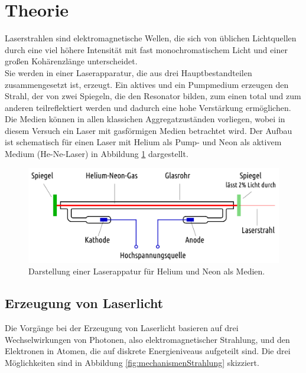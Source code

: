 \section{Theorie}
\label{sec:Theorie}

Laserstrahlen sind elektromagnetische Wellen, die sich von üblichen Lichtquellen durch eine viel höhere Intensität mit fast monochromatischem Licht und einer großen Kohärenzlänge unterscheidet.\\
Sie werden in einer Laserapparatur, die aus drei Hauptbestandteilen zusammengesetzt ist, erzeugt. Ein aktives und ein Pumpmedium erzeugen den Strahl, der von zwei Spiegeln, die den Resonator bilden, zum einen total und zum anderen teilreflektiert werden und dadurch eine hohe Verstärkung ermöglichen. Die Medien können in allen klassichen Aggregatzuständen vorliegen, wobei in diesem Versuch ein Laser mit gasförmigen Medien betrachtet wird. Der Aufbau ist schematisch für einen Laser mit Helium als Pump- und Neon als aktivem Medium (He-Ne-Laser) in Abbildung \ref{fig:skizzeLaser} dargestellt.

\begin{figure}
  \centering
  \includegraphics[width=\textwidth]{data/apparatur.png}
  \caption{Darstellung einer Laserappatur für Helium und Neon als Medien.\cite{leifi}}
  \label{fig:skizzeLaser}
\end{figure}

\subsection{Erzeugung von Laserlicht}
\label{sec:erzeugung}
Die Vorgänge bei der Erzeugung von Laserlicht basieren auf drei Wechselwirkungen von Photonen, also elektromagnetischer Strahlung, und den Elektronen in Atomen, die auf diskrete Energieniveaus aufgeteilt sind. Die drei Möglichkeiten sind in Abbildung \ref{fig:mechanismenStrahlung} skizziert.

